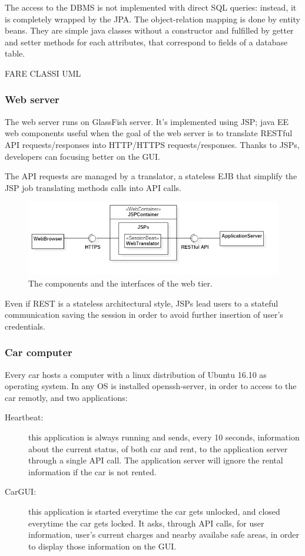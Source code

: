 The access to the DBMS is not implemented with direct SQL queries: instead, it is completely wrapped by the JPA. The object-relation mapping is done by entity beans. They are simple java classes without a constructor and fulfilled by getter and setter methods for each attributes, that correspond to fields of a database table.

FARE CLASSI UML

\subsubsection{Web server}

The web server runs on GlassFish server. It's implemented using JSP; java EE web components useful when the goal of the web server is to translate RESTful API requests/responses into  HTTP/HTTPS requests/responses. Thanks to JSPs, developers can focusing better on the GUI.

The API requests are managed by a translator, a stateless EJB that simplify the JSP job translating methods calls into API calls.


\begin{figure}[H]
	\centering
	\includegraphics[width=\textwidth, keepaspectratio]{diagrams/WebComponents.png}
	\caption{The components and the interfaces of the web tier.}
	\label {fig:web-components}
\end{figure}

Even if REST is a stateless architectural style, JSPs lead users to a stateful communication saving the session in order to avoid further insertion of user's credentials.

\subsubsection{Car computer}

Every car hosts a computer with a linux distribution of Ubuntu 16.10 as operating system. In any OS is installed openssh-server, in order to access to the car remotly, and two applications:
\begin{description}
	\item[Heartbeat:] this application is always running and sends, every 10 seconds, information about the current status, of both car and rent, to the application server through a single API call. The application server will ignore the rental information if the car is not rented.
	\item[CarGUI:] this application is started everytime the car gets unlocked, and closed everytime the car gets locked. It asks, through API calls, for user information, user's current charges and nearby availabe safe areas, in order to display those information on the GUI.
\end{description}

